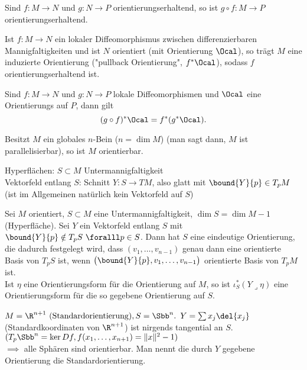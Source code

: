 \begin{rem*}
	Sind \( f: M \to N \) und \( g: N \to P \) orientierungserhaltend, so ist \( g \circ f: M \to P \) orientierungserhaltend.
\end{rem*}

\begin{lem}
	Ist \( f:M \to N \) ein lokaler Diffeomorphismus zwischen differenzierbaren Mannigfaltigkeiten und ist $N$ orientiert (mit Orientierung $\Ocal$), so trägt $M$ eine induzierte Orientierung ("pullback Orientierung", $f^*\Ocal$), sodass $f$ orientierungserhaltend ist.
\end{lem}

\begin{rem}
	Sind $f:M \to N$ und $g: N \to P$ lokale Diffeomorphismen und $\Ocal$ eine Orientierungs auf $P$, dann gilt
	\[ (g\circ f) ^* \Ocal = f^*(g^*\Ocal). \]
\end{rem}

\begin{lem}
	Besitzt $M$ ein globales $n$-Bein ($n = \dim M$) (man sagt dann, $M$ ist parallelisierbar), so ist $M$ orientierbar.
\end{lem}

\noindent Hyperflächen: \( S \subset M \) Untermannigfaltigkeit\\
Vektorfeld entlang $S$: Schnitt \( Y: S \to TM \), also glatt mit \( \bound{Y}{p} \in T_pM \) (ist im Allgemeinen natürlich kein Vektorfeld auf $S$)

\begin{lem}\label{8.14}
	Sei $M$ orientiert, \( S \subset M \) eine Untermannigfaltigkeit, \( \dim S = \dim M - 1 \) (Hyperfläche). Sei \( Y \) ein Vektorfeld entlang $S$ mit \( \bound{Y}{p} \notin T_pS\ \foralll p \in S \). Dann hat $S$ eine eindeutige Orientierung, die dadurch festgelegt wird, dass \( (v_1, \dotsc, v_{n-1}) \) genau dann eine orientierte Basis von $T_pS$ ist, wenn \( \big(\bound{Y}{p},v_1,\dotsc,v_{n-1}\big) \) orientierte Basis von $T_pM$ ist.\\
	Ist $\eta$ eine Orientierungsform für die Orientierung auf $M$, so ist \( \iota_S^*(Y \lrcorner \eta) \) eine Orientierungsform für die so gegebene Orientierung auf $S$.
\end{lem}

\begin{exmp*}
\end{exmp*}

\begin{exmp*}
	\( M = \R^{n+1} \ (\text{Standardorientierung}), S = \Sbb^n. \) \( Y = \sum x_j \del{x_j} \) (Standardkoordinaten von $\R^{n+1}$) ist nirgends tangential an $S$.\\
	\( ( T_p\Sbb^n = \ker Df, f(x_1,\dotsc,x_{n+1}) = \|x\|^2-1) \)\\
	$\implies$ alle Sphären sind orientierbar. Man nennt die durch $Y$ gegebene Orientierung die Standardorientierung.
\end{exmp*}

